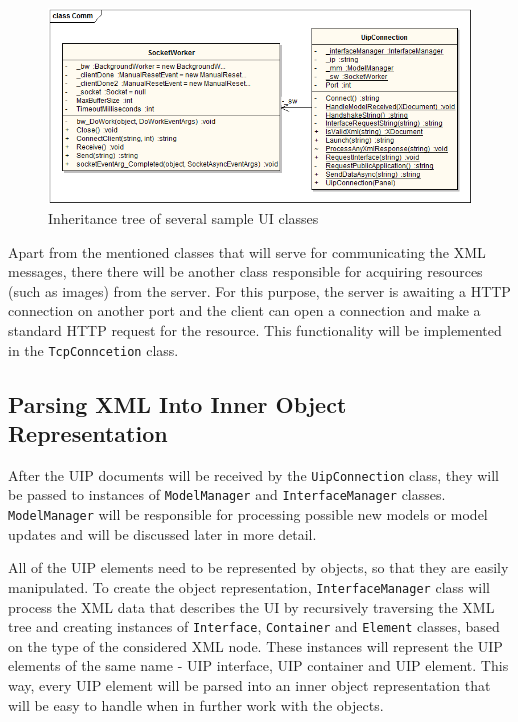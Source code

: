 \begin{figure}[ht!]
\centering
\includegraphics[width=145mm]{pics/3/classComm.png}
\caption{Inheritance tree of several sample UI classes}
\label{fig:classComm}
\end{figure}

Apart from the mentioned classes that will serve for communicating the XML messages, there there will be another class responsible for acquiring resources (such as images) from the server. For this purpose, the server is awaiting a HTTP connection on another port and the client can open a connection and make a standard HTTP request for the resource. This functionality will be implemented in the \texttt{TcpConncetion} class.

\subsection{Parsing XML Into Inner Object Representation}
After the UIP documents will be received by the \texttt{UipConnection} class, they will be passed to instances of \texttt{ModelManager} and \texttt{InterfaceManager} classes. \texttt{ModelManager} will be responsible for processing possible new models or model updates and will be discussed later in more detail.

All of the UIP elements need to be represented by objects, so that they are easily manipulated. To create the object representation, \texttt{InterfaceManager} class will process the XML data that describes the UI by recursively traversing the XML tree and creating instances of \texttt{Interface}, \texttt{Container} and \texttt{Element} classes, based on the type of the considered XML node. These instances will represent the UIP elements of the same name - UIP interface, UIP container and UIP element. This way, every UIP element will be parsed into an inner object representation that will be easy to handle when in further work with the objects.

